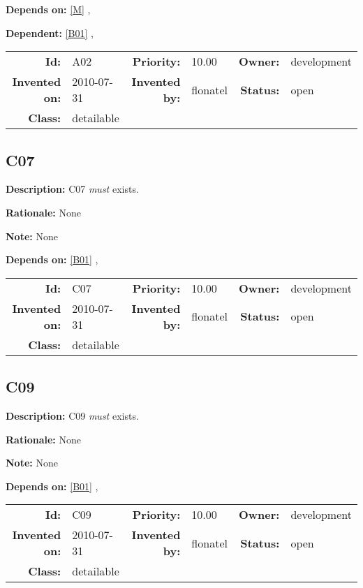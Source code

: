 \textbf{Depends on:} \ref{M} , 

\textbf{Dependent:} \ref{B01} , 

\par
{\small \begin{center}\begin{tabular}{rlrlrl}
\textbf{Id:} & A02 & \textbf{Priority:} & 10.00 & \textbf{Owner:} & development \\ 
\textbf{Invented on:} & 2010-07-31 & \textbf{Invented by:} & flonatel & \textbf{Status:} & open \\ 
\textbf{Class:} & detailable & & & & \\ 
\end{tabular}\end{center} }%
\subsection{C07}\label{C07}
\textbf{Description:} C07 \textsl{must} exists.

\textbf{Rationale:} None

\textbf{Note:} None

\textbf{Depends on:} \ref{B01} , 

\par
{\small \begin{center}\begin{tabular}{rlrlrl}
\textbf{Id:} & C07 & \textbf{Priority:} & 10.00 & \textbf{Owner:} & development \\ 
\textbf{Invented on:} & 2010-07-31 & \textbf{Invented by:} & flonatel & \textbf{Status:} & open \\ 
\textbf{Class:} & detailable & & & & \\ 
\end{tabular}\end{center} }%
\subsection{C09}\label{C09}
\textbf{Description:} C09 \textsl{must} exists.

\textbf{Rationale:} None

\textbf{Note:} None

\textbf{Depends on:} \ref{B01} , 

\par
{\small \begin{center}\begin{tabular}{rlrlrl}
\textbf{Id:} & C09 & \textbf{Priority:} & 10.00 & \textbf{Owner:} & development \\ 
\textbf{Invented on:} & 2010-07-31 & \textbf{Invented by:} & flonatel & \textbf{Status:} & open \\ 
\textbf{Class:} & detailable & & & & \\ 
\end{tabular}\end{center} }%
